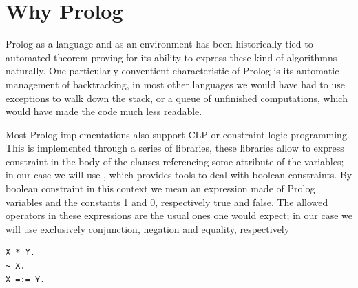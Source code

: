 \documentclass[a4paper, 12pt, english]{report}
\begin{document}


\section{Why Prolog}
Prolog as a language and as an environment has been historically tied to automated theorem proving for its ability to express these kind of algorithmns naturally.
One particularly conventient characteristic of Prolog is its automatic management of backtracking, in most other languages we would have had to use exceptions to walk down the stack, or a queue of unfinished computations, which would have made the code much less readable.

Most Prolog implementations also support CLP or constraint logic programming.
This is implemented through a series of libraries, these libraries allow to express constraint in the body of the clauses referencing some attribute of the variables;
in our case we will use \CLPB \cite{clpb}, which provides tools to deal with boolean constraints.
By boolean constraint in this context we mean an expression made of Prolog variables and the constants 1 and 0, respectively true and false.
The allowed operators in these expressions are the usual ones one would expect; in our case we will use exclusively conjunction, negation and equality, respectively
\begin{verbatim}
X * Y.
~ X.
X =:= Y.
\end{verbatim}
\end{document}
